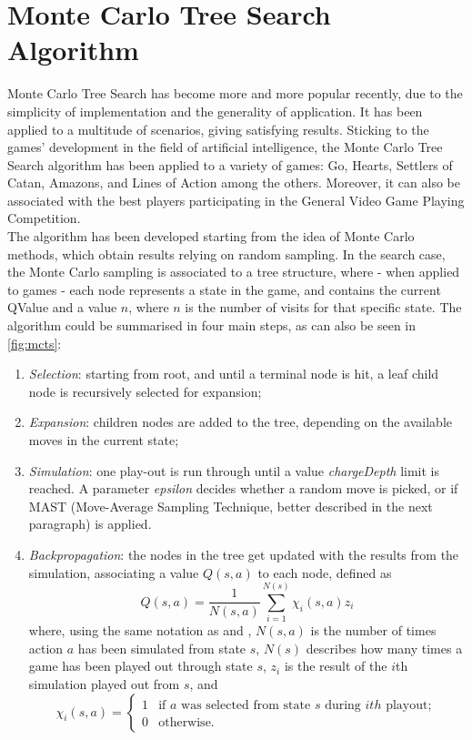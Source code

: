 \section{Monte Carlo Tree Search Algorithm}\label{sec:mctstheory}
Monte Carlo Tree Search has become more and more popular recently, due to the simplicity of implementation and the generality of application. It has been applied to a multitude of scenarios, giving satisfying results. Sticking to the games' development in the field of artificial intelligence, the Monte Carlo Tree Search algorithm has been applied to a variety of games: Go\cite{gelly2011monte,gelly2006modification,enzenberger2010fuego}, Hearts\cite{santoevaluating}, Settlers of Catan\cite{szita2009monte}, Amazons\cite{lorentz2008amazons}, and Lines of Action\cite{winands2010monte,winands2009evaluation} among the others. Moreover, it can also be associated with the best players participating in the General Video Game Playing Competition\cite{perez20162014}.
\\The algorithm has been developed starting from the idea of Monte Carlo methods, which obtain results relying on random sampling. In the search case, the Monte Carlo sampling is associated to a tree structure, where - when applied to games - each node represents a state in the game, and contains the current QValue and a value $n$, where $n$ is the number of visits for that specific state\cite{chaslot2008progressive}. The algorithm could be summarised in four main steps\cite{chaslot2010monte}, as can also be seen in \ref{fig:mcts}: 
\begin{enumerate}
\item \emph{Selection}: starting from root, and until a terminal node is hit, a leaf child node is recursively selected for expansion;
\item \emph{Expansion}: children nodes are added to the tree, depending on the available moves in the current state;
\item \emph{Simulation}: one play-out is run through until a value \emph{chargeDepth} limit is reached. A parameter \emph{epsilon} decides whether a random move is picked, or if MAST (Move-Average Sampling Technique, better described in the next paragraph) is applied.
\item \emph{Backpropagation}: the nodes in the tree get updated with the results from the simulation, associating a value $Q(s,a)$ to each node, defined as \begin{equation}\label{eq:mcts}
Q(s,a) = \frac{1}{N(s,a)} \sum_{i=1}^{N(s)} \chi_{i}(s,a) z_i
\end{equation}
where, using the same notation as \cite{gelly2011monte} and \cite{browne2012survey}, $N(s,a)$ is the number of times action $a$ has been simulated from state $s$, $N(s)$ describes how many times a game has been played out through state $s$, $z_i$ is the result of the $i$th simulation played out from $s$, and\\ $$\chi_{i}(s,a) = 
\begin{cases}
1 & \text{if }a\text{ was selected from state }s\text{ during $ith$ playout};\\
0 & \text{otherwise}.
\end{cases}$$
\end{enumerate}

